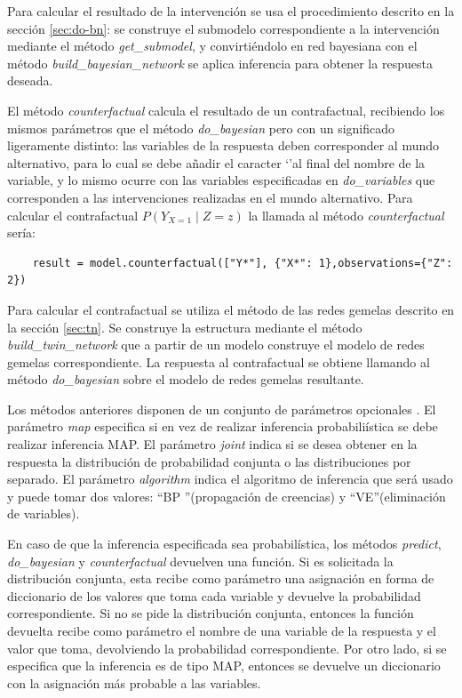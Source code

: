 Para calcular el resultado de la intervención se usa el procedimiento descrito en la sección \ref{sec:do-bn}: se construye el submodelo correspondiente a la intervención mediante el método \textit{get\_submodel}, y convirtiéndolo en red bayesiana con el método \textit{build\_bayesian\_network} se aplica inferencia para obtener la respuesta deseada. 

El método \textit{counterfactual} calcula el resultado de un contrafactual, recibiendo los mismos parámetros que el método \textit{do\_bayesian} pero con un significado ligeramente distinto: las variables de la respuesta deben corresponder al mundo alternativo, para lo cual se debe añadir el caracter \textquoteleft*\textquoteright al final del nombre de la variable, y lo mismo ocurre con las variables especificadas en \textit{do\_variables} que corresponden a las intervenciones realizadas en el mundo alternativo. Para calcular el contrafactual $P(Y_{X=1} \mid Z=z)$ la llamada al método \textit{counterfactual} sería:
\begin{lstlisting}
	result = model.counterfactual(["Y*"], {"X*": 1},observations={"Z": 2})
\end{lstlisting}
Para calcular el contrafactual se utiliza el método de las redes gemelas descrito en la sección \ref{sec:tn}. Se construye la estructura mediante el método \textit{build\_twin\_network} que a partir de un modelo construye el modelo de redes gemelas correspondiente. La respuesta al contrafactual se obtiene llamando al método \textit{do\_bayesian} sobre el modelo de redes gemelas resultante.

Los métodos anteriores disponen de un conjunto de parámetros opcionales . El parámetro \textit{map} especifica si en vez de realizar inferencia probabiliística se debe realizar inferencia MAP. El parámetro \textit{joint} indica si se desea obtener en la respuesta la distribución de probabilidad conjunta o las distribuciones por separado. El parámetro \textit{algorithm} indica el algoritmo de inferencia que será usado y puede tomar dos valores: \textquotedblleft BP \textquotedblright(propagación de creencias) y \textquotedblleft VE\textquotedblright(eliminación de variables).	

En caso de que la inferencia especificada sea probabilística, los métodos \textit{predict}, \textit{do\_bayesian} y \textit{counterfactual} devuelven una función. Si es solicitada la distribución conjunta, esta recibe como parámetro una asignación en forma de diccionario de los valores que toma cada variable y devuelve la probabilidad correspondiente. Si no se pide la distribución conjunta, entonces la función devuelta recibe como parámetro el nombre de una variable de la respuesta y el valor que toma, devolviendo la probabilidad correspondiente. Por otro lado, si se especifica que la inferencia es de tipo MAP, entonces se devuelve un diccionario con la asignación más probable a las variables.

